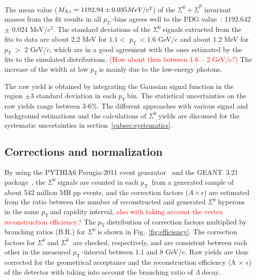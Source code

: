 \documentclass[ALICE,manyauthors]{cernphprep}
\newcommand{\sig}{\ensuremath{\Sigma^0  \; }}
\newcommand{\asig}{\ensuremath{\overline{\Sigma^0} \; }}
\newcommand{\lam}{\ensuremath{\Lambda \; }}
\newcommand{\pt}{\ensuremath{p_{\mathrm{T}\; }}}
\newcommand{\red}{\textcolor{red}}
\begin{document}
The mean value ($M_{\Lambda \gamma} = 1192.94 \pm 0.035 MeV/\rm{c}^2$) of the 
$\Sigma^0+ \overline{\Sigma}^{0}$ invariant masses from the fit results in all \pt-bins agrees
well to the PDG value~\cite{cite:PDG}: 1192.642 $\pm$ 0.024 MeV/c$^2$.
The standard deviations of the \sig signals extracted from the fits to data are about 2.2 MeV for 
$1.1 <$ \pt $< 1.6$ GeV/$c$ and about 1.2 MeV for \pt$>$ 2 GeV/$c$, which are in a good agreement 
with the ones estimated by the fits to the simulated distributions. \red{(How about then between 1.6 -- 2 GeV/c?)}
The increase of the width at low \pt is mainly due to the low-energy photons.

The raw yield is obtained by integrating the Gaussian signal function in the region $\pm 3$ standard deviation 
in each  \pt  bin. The statistical uncertainties on the raw yields range between 3-6\%.
The different approaches with various signal and background estimations and 
the calculations of \sig yields are discussed for the systematic uncertainties in section~\ref{subsec:systematics}.

 \subsection{Corrections and normalization}

By using the PYTHIA6 Perugia-2011 event generator~\cite{cite:pythia6}
and the GEANT~3.21 package~\cite{cite:GEANT}, the \sig signals are counted in each \pt
from a generated sample of about 542 million MB pp events, and the correction factors ($A\times\epsilon$) are 
estimated from the ratio between the number of reconstructed and generated \sig hyperons 
in the same \pt and rapidity interval, \red{also with taking account the vertex reconstruction efficiency.?} 
The \pt distribution of correction factors multiplied by branching 
ratios (B.R.) for \sig is shown in Fig.~\ref{fig:efficiency}. The correction factors for \sig and \asig 
are checked, respectively, and are consistent between each other in the measured \pt-interval between 
1.1 and 8 GeV/$c$. Raw yields are thus corrected for the geometrical acceptance and the reconstruction efficiency
(A $\times$ $\epsilon$) of the detector with taking into account the branching ratio of \lam decay.
\end{document}

